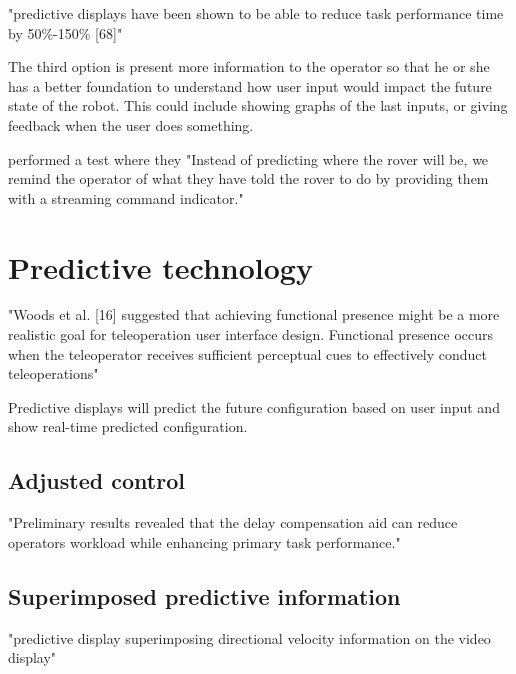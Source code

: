\citep{Chen2007} "predictive displays have been shown to be able to reduce task performance time by 50\%-150\% [68]"

The third option is present more information to the operator so that he or she has a better foundation to understand how user input would impact the future state of the robot. This could include showing graphs of the last inputs, or giving feedback when the user does something.

\citep{Miller2005} performed a test where they "Instead of predicting where the rover will be, we remind the operator of what they have told the rover to do by providing them with a streaming command indicator."

\section{Predictive technology}


\citep{Chen2007} "Woods et al. [16] suggested that achieving functional presence might be a more realistic goal for teleoperation user interface design. Functional presence occurs when the teleoperator receives sufficient perceptual cues to effectively conduct teleoperations"

Predictive displays will predict the future configuration based on user input and show real-time predicted configuration.

\subsection{Adjusted control}

\citep{Lu2018} "Preliminary results revealed that the delay compensation aid can reduce operators workload while enhancing primary task performance."


\subsection{Superimposed predictive information}

\citep{Mathan1996} "predictive display superimposing directional
velocity information on the video display"

